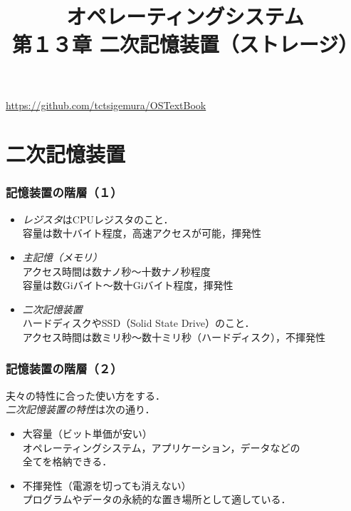 \documentclass[unicode]{beamer}                   %
\begin{document}
\title[二次記憶装置]
      {オペレーティングシステム\\第１３章 二次記憶装置（ストレージ）}
\date{}
\begin{frame}
  \titlepage
  \centerline{\url{https://github.com/tctsigemura/OSTextBook}}
\end{frame}


\section{二次記憶装置}
\begin{frame}
  \frametitle{記憶装置の階層（１）}
  \begin{itemize}
  \item \emph{レジスタ}はCPUレジスタのこと．\\
    容量は数十バイト程度，高速アクセスが可能，揮発性
  \item \emph{主記憶（メモリ）} \\
    アクセス時間は数ナノ秒〜十数ナノ秒程度\\
    容量は数Giバイト〜数十Giバイト程度，揮発性
  \item \emph{二次記憶装置} \\
    ハードディスクやSSD（Solid State Drive）のこと．\\
    アクセス時間は数ミリ秒〜数十ミリ秒（ハードディスク），不揮発性
\end{itemize}
\end{frame}

\begin{frame}
  \frametitle{記憶装置の階層（２）}
  夫々の特性に合った使い方をする．\\
  \emph{二次記憶装置の特性}は次の通り．
  \begin{itemize}
  \item 大容量（ビット単価が安い）\\
    オペレーティングシステム，アプリケーション，データなどの\\
    全てを格納できる．
  \item 不揮発性（電源を切っても消えない） \\
    プログラムやデータの永続的な置き場所として適している．
  \end{itemize}
  \vfill
\end{frame}
\end{document}
